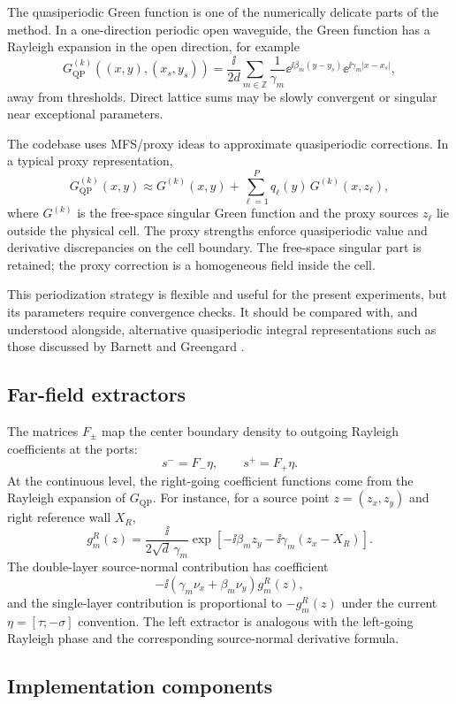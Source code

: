 The quasiperiodic Green function is one of the numerically delicate parts of the
method.  In a one-direction periodic open waveguide, the Green function has a
Rayleigh expansion in the open direction, for example
\[
  G_{\mathrm{QP}}^{(k)}((x,y),(x_s,y_s))
  =
  \frac{\ii}{2d}
  \sum_{m\in\mathbb Z}
  \frac{1}{\gamma_m}
  \ee^{\ii\beta_m(y-y_s)}
  \ee^{\ii\gamma_m|x-x_s|},
\]
away from thresholds.  Direct lattice sums may be slowly convergent or singular
near exceptional parameters.

The codebase uses MFS/proxy ideas to approximate quasiperiodic corrections.  In
a typical proxy representation,
\[
  G_{\mathrm{QP}}^{(k)}(x,y)
  \approx
  G^{(k)}(x,y)
  +
  \sum_{\ell=1}^{P}q_\ell(y)\,G^{(k)}(x,z_\ell),
\]
where \(G^{(k)}\) is the free-space singular Green function and the proxy
sources \(z_\ell\) lie outside the physical cell.  The proxy strengths enforce
quasiperiodic value and derivative discrepancies on the cell boundary.  The
free-space singular part is retained; the proxy correction is a homogeneous
field inside the cell.

This periodization strategy is flexible and useful for the present experiments,
but its parameters require convergence checks.  It should be compared with, and
understood alongside, alternative quasiperiodic integral representations such as
those discussed by Barnett and Greengard \cite{BarnettGreengard2010}.

\subsection{Far-field extractors}

The matrices \(F_\pm\) map the center boundary density to outgoing Rayleigh
coefficients at the ports:
\[
  s^- = F_-\eta,
  \qquad
  s^+ = F_+\eta .
\]
At the continuous level, the right-going coefficient functions come from the
Rayleigh expansion of \(G_{\mathrm{QP}}\).  For instance, for a source point
\(z=(z_x,z_y)\) and right reference wall \(X_R\),
\[
  g_m^R(z)
  =
  \frac{\ii}{2\sqrt d\,\gamma_m}
  \exp[-\ii\beta_m z_y-\ii\gamma_m(z_x-X_R)] .
\]
The double-layer source-normal contribution has coefficient
\[
  -\ii(\gamma_m\nu_x+\beta_m\nu_y)g_m^R(z),
\]
and the single-layer contribution is proportional to \(-g_m^R(z)\) under the
current \(\eta=[\tau;-\sigma]\) convention.  The left extractor is analogous
with the left-going Rayleigh phase and the corresponding source-normal
derivative formula.

\subsection{Implementation components}

